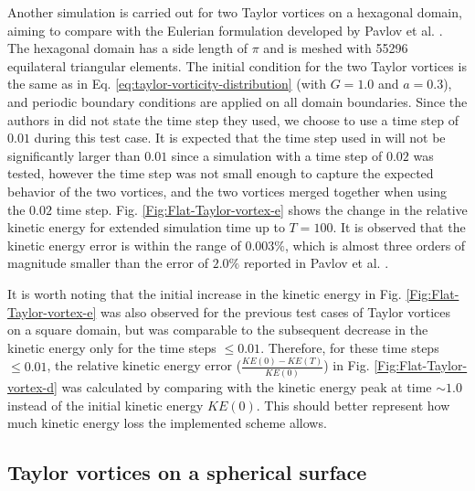 \documentclass[final,12pt,times]{elsarticle}
\begin{document}
Another simulation is carried out for two Taylor vortices on a hexagonal domain, aiming to compare with the Eulerian formulation developed by Pavlov et al. \cite{pavlov2011structure}. The hexagonal domain has a side length of $\pi$ and is meshed with 55296 equilateral triangular elements. The initial condition for the two Taylor vortices is the same as in Eq. \eqref{eq:taylor-vorticity-distribution} (with $G=1.0$ and $a=0.3$), and periodic boundary conditions are applied on all domain boundaries. Since the authors in \cite{pavlov2011structure} did not state the time step they used, we choose to use a time step of $0.01$ during this test case. It is expected that the time step used in \cite{pavlov2011structure} will not be significantly larger than $0.01$ since a simulation with a time step of $0.02$ was tested, however the time step was not small enough to capture the expected behavior of the two vortices, and the two vortices merged together when using the $0.02$ time step. Fig. \ref{Fig:Flat-Taylor-vortex-e} shows the change in the relative kinetic energy for extended simulation time up to $T=100$. It is observed that the kinetic energy error is within the range of $0.003\%$, which is almost three orders of magnitude smaller than the error of $2.0\%$ reported in Pavlov et al. \cite{pavlov2011structure}. 

It is worth noting that the initial increase in the kinetic energy in Fig. \ref{Fig:Flat-Taylor-vortex-e} was also observed for the previous test cases of Taylor vortices on a square domain, but was comparable to the subsequent decrease in the kinetic energy only for the time steps $\leq 0.01$. Therefore, for these time steps $\leq 0.01$, the relative kinetic energy error ($\frac{KE(0) - KE(T)}{KE(0)}$) in Fig. \ref{Fig:Flat-Taylor-vortex-d} was calculated by comparing with the kinetic energy peak at time $\sim 1.0$ instead of the initial kinetic energy $KE(0)$. This should better represent how much kinetic energy loss the implemented scheme allows.                


\subsection{Taylor vortices on a spherical surface}
\label{subsec:spherical-Taylor-vortices}
\end{document}
